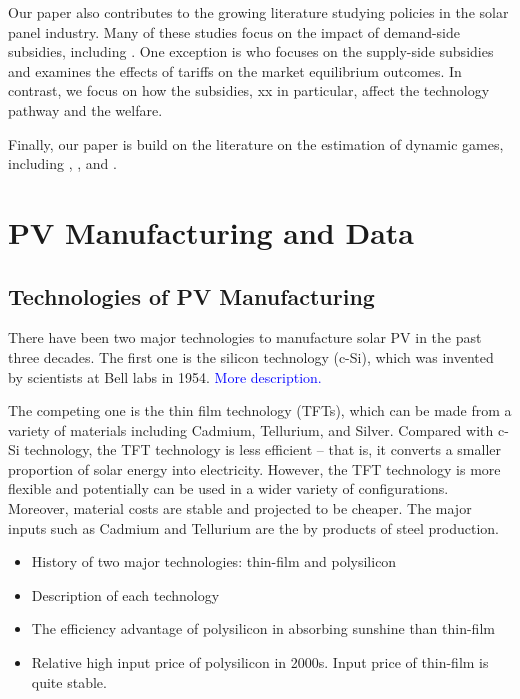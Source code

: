 \documentclass[12pt]{article}
\begin{document}
Our paper also contributes to the growing literature studying policies in the solar panel industry. Many of these studies focus on the impact of demand-side subsidies, including \citet{de2019subsidies}. One exception is
\citet{bollinger2024strategic} who focuses on the supply-side subsidies and examines the effects of tariffs on the market equilibrium outcomes. In contrast, we focus on how the subsidies, xx in particular, affect the technology pathway and the welfare.

Finally, our paper is build on the literature on the estimation of dynamic games, including \citet{bajari2007estimating}, \citet{ryan2012costs}, and \citet{sweeting2013dynamic}.

\section{PV Manufacturing and Data}
\label{sec:institution_data}

\subsection{Technologies of PV Manufacturing}
\label{subsec:inst_PV_tech}

There have been two major technologies to manufacture solar PV in the past three decades.  The first one is the silicon technology (c-Si), which was invented by scientists at Bell labs in 1954. \textcolor{blue}{More description.}

The competing one is the thin film technology (TFTs), which can be made from a variety of materials including Cadmium, Tellurium, and Silver. Compared with c-Si technology, the TFT technology is less efficient -- that is, it converts a smaller proportion of solar energy into electricity. However, the TFT technology is more flexible and potentially can be used in a wider variety of configurations. Moreover, material costs are stable and projected to be cheaper. The major inputs such as Cadmium and Tellurium are the by products of steel production.


\begin{itemize}
    \item History of two major technologies: thin-film and polysilicon
    \item Description of each technology
    \item The efficiency advantage of polysilicon in absorbing sunshine than thin-film
    \item Relative high input price of polysilicon in 2000s. Input price of thin-film is quite stable.
\end{itemize}
\end{document}
